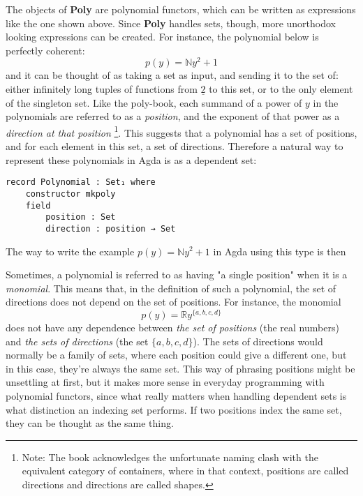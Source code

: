 The objects of \textbf{Poly} are polynomial functors, which can be written as expressions like the one shown above. Since \textbf{Poly} handles sets, though, more unorthodox looking expressions can be created. For instance, the polynomial below is perfectly coherent:
\begin{equation}
p(y) = \mathbb{N}y^2 + 1
\label{eqn.natpoly}
\end{equation}
and it can be thought of as taking a set as input, and sending it to the set of: either infinitely long tuples of functions from $\underline{2}$ to this set, or to the only element of the singleton set. Like the poly-book, each summand of a power of $y$ in the polynomials are referred to as a \textit{position}, and the exponent of that power as a \textit{direction at that position}
\footnote{Note: The book acknowledges the unfortunate naming clash with the equivalent category of containers, where in that context, positions are called directions and directions are called shapes.}.
This suggests that a polynomial has a set of positions, and for each element in this set, a set of directions. Therefore a natural way to represent these polynomials in Agda is as a dependent set:

\begin{verbatim}
record Polynomial : Set₁ where
    constructor mkpoly
    field
        position : Set
        direction : position → Set
\end{verbatim}
The way to write the example $p(y) = \mathbb{N}y^2 + 1$ in Agda using this type is then

Sometimes, a polynomial is referred to as having "a single position" when it is a \textit{monomial}.
This means that, in the definition of such a polynomial, the set of directions does not depend on the set of positions.
For instance, the monomial
$$
p(y) = \mathbb{R}y^{\{a, b, c, d\}}
$$
does not have any dependence between \textit{the set of positions} (the real numbers) and \textit{the sets of directions} (the set $\{a, b, c, d\}$).
The sets of directions would normally be a family of sets, where each position could give a different one, but in this case, they're always the same set.
This way of phrasing positions might be unsettling at first, but it makes more sense in everyday programming with polynomial functors, since what really matters when handling dependent sets is what distinction an indexing set performs. 
If two positions index the same set, they can be thought as the same thing.

